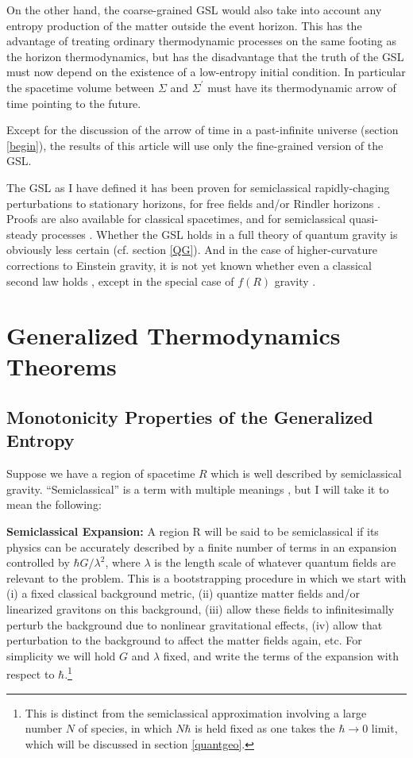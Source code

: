 \documentclass[12pt]{article}
\begin{document}
On the other hand, the coarse-grained GSL would also take into account any entropy production of the matter outside the event horizon.  This has the advantage of treating ordinary thermodynamic processes on the same footing as the horizon thermodynamics, but has the disadvantage that the truth of the GSL must now depend on the existence of a low-entropy initial condition.  In particular the spacetime volume between $\Sigma$ and $\Sigma^\prime$ must have its thermodynamic arrow of time pointing to the future.  

Except for the discussion of the arrow of time in a past-infinite universe (section \ref{begin}), the results of this article will use only the fine-grained version of the GSL.

The GSL as I have defined it has been proven for semiclassical rapidly-chaging perturbations to stationary horizons, for free fields and/or Rindler horizons \cite{myproofs}.  Proofs are also available for classical spacetimes, and for semiclassical quasi-steady processes \cite{10proofs}.  Whether the GSL holds in a full theory of quantum gravity is obviously less certain (cf. section \ref{QG}).  And in the case of higher-curvature corrections to Einstein gravity, it is not yet known whether even a classical second law holds \cite{lovelock}, except in the special case of $f(R)$ gravity \cite{fR}.

\section{Generalized Thermodynamics Theorems}\label{theorems}

\subsection{Monotonicity Properties of the Generalized Entropy}

Suppose we have a region of spacetime $R$ which is well described by semiclassical gravity.  ``Semiclassical'' is a term with multiple meanings \cite{10proofs}, but I will take it to mean the following:

\textbf{Semiclassical Expansion:} A region R will be said to be semiclassical if its physics can be accurately described by a finite number of terms in an expansion controlled by $\hbar G / \lambda^2$, where $\lambda$ is the length scale of whatever quantum fields are relevant to the problem.  This is a bootstrapping procedure in which we start with (i) a fixed classical background metric, (ii) quantize matter fields and/or linearized gravitons on this background, (iii) allow these fields to infinitesimally perturb the background due to nonlinear gravitational effects, (iv) allow that perturbation to the background to affect the matter fields again, etc.  For simplicity we will hold $G$ and $\lambda$ fixed, and write the terms of the expansion with respect to $\hbar$.\footnote{This is distinct from the semiclassical approximation involving a large number $N$ of species, in which $N\hbar$ is held fixed as one takes the $\hbar \to 0$ limit, which will be discussed in section \ref{quantgeo}.}
\end{document}
